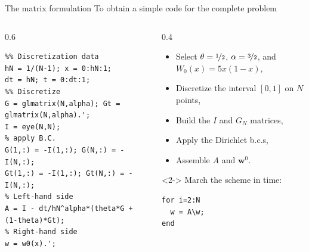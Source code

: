 \documentclass[aspectratio=169,xcolor=dvipsnames]{beamer}
\begin{document}
\begin{frame}[fragile]{The matrix formulation}
To obtain a simple code for the complete problem
\begin{columns}
\begin{column}{0.6\columnwidth}
\begin{verbatim}
%% Discretization data
hN = 1/(N-1); x = 0:hN:1;
dt = hN; t = 0:dt:1;
%% Discretize
G = glmatrix(N,alpha); Gt = glmatrix(N,alpha).';
I = eye(N,N);
% apply B.C.
G(1,:) = -I(1,:); G(N,:) = -I(N,:);
Gt(1,:) = -I(1,:); Gt(N,:) = -I(N,:);
% Left-hand side
A = I - dt/hN^alpha*(theta*G + (1-theta)*Gt);
% Right-hand side
w = w0(x).'; 
\end{verbatim}
\end{column}
\begin{column}{0.4\columnwidth}
\begin{itemize}
\item Select $\theta = \nicefrac{1}{2}$, $\alpha = \nicefrac{3}{2}$, and $W_0(x) = 5 x(1-x)$,
\item Discretize the interval $[0,1]$ on $N$ points,
\item Build the $I$ and $G_N$ matrices,
\item Apply the Dirichlet b.c.s,
\item Assemble $A$ and $\mathbf{w}^0$.
\end{itemize}

\begin{onlyenv}<2->
March the scheme in time:
\begin{verbatim}
for i=2:N
  w = A\w;
end
\end{verbatim}
\end{onlyenv}

\end{column}
\end{columns}

\end{frame}
\end{document}
